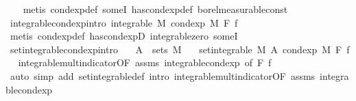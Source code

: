 \begin{isabellebody}
%
\isadelimproof
\ \ %
\endisadelimproof
%
\isatagproof
{}\isamarkupfalse%
\ {\isacharparenleft}{\kern0pt}metis\ cond{\isacharunderscore}{\kern0pt}exp{\isacharunderscore}{\kern0pt}def\ someI\ has{\isacharunderscore}{\kern0pt}cond{\isacharunderscore}{\kern0pt}exp{\isacharunderscore}{\kern0pt}def\ borel{\isacharunderscore}{\kern0pt}measurable{\isacharunderscore}{\kern0pt}const{\isacharparenright}{\kern0pt}%
\endisatagproof
{\isafoldproof}%
%
\isadelimproof
\isanewline
%
\endisadelimproof
\isanewline
{}\isamarkupfalse%
\ integrable{\isacharunderscore}{\kern0pt}cond{\isacharunderscore}{\kern0pt}exp{\isacharbrackleft}{\kern0pt}intro{\isacharbrackright}{\kern0pt}{\isacharcolon}{\kern0pt}\ {\isachardoublequoteopen}integrable\ M\ {\isacharparenleft}{\kern0pt}cond{\isacharunderscore}{\kern0pt}exp\ M\ F\ f{\isacharparenright}{\kern0pt}{\isachardoublequoteclose}\ \isanewline
%
\isadelimproof
\ \ %
\endisadelimproof
%
\isatagproof
{}\isamarkupfalse%
\ {\isacharparenleft}{\kern0pt}metis\ cond{\isacharunderscore}{\kern0pt}exp{\isacharunderscore}{\kern0pt}def\ has{\isacharunderscore}{\kern0pt}cond{\isacharunderscore}{\kern0pt}expD{\isacharparenleft}{\kern0pt}{}{\isacharparenright}{\kern0pt}\ integrable{\isacharunderscore}{\kern0pt}zero\ someI{\isacharparenright}{\kern0pt}%
\endisatagproof
{\isafoldproof}%
%
\isadelimproof
\isanewline
%
\endisadelimproof
\isanewline
{}\isamarkupfalse%
\ set{\isacharunderscore}{\kern0pt}integrable{\isacharunderscore}{\kern0pt}cond{\isacharunderscore}{\kern0pt}exp{\isacharbrackleft}{\kern0pt}intro{\isacharbrackright}{\kern0pt}{\isacharcolon}{\kern0pt}\isanewline
\ \ \ {\isachardoublequoteopen}A\ {\isasymin}\ sets\ M{\isachardoublequoteclose}\isanewline
\ \ \ {\isachardoublequoteopen}set{\isacharunderscore}{\kern0pt}integrable\ M\ A\ {\isacharparenleft}{\kern0pt}cond{\isacharunderscore}{\kern0pt}exp\ M\ F\ f{\isacharparenright}{\kern0pt}{\isachardoublequoteclose}%
\isadelimproof
\ %
\endisadelimproof
%
\isatagproof
{}\isamarkupfalse%
\ integrable{\isacharunderscore}{\kern0pt}mult{\isacharunderscore}{\kern0pt}indicator{\isacharbrackleft}{\kern0pt}OF\ assms\ integrable{\isacharunderscore}{\kern0pt}cond{\isacharunderscore}{\kern0pt}exp{\isacharcomma}{\kern0pt}\ of\ F\ f{\isacharbrackright}{\kern0pt}\ \isamarkupfalse%
\ {\isacharparenleft}{\kern0pt}auto\ simp\ add{\isacharcolon}{\kern0pt}\ set{\isacharunderscore}{\kern0pt}integrable{\isacharunderscore}{\kern0pt}def\ intro{\isacharbang}{\kern0pt}{\isacharcolon}{\kern0pt}\ integrable{\isacharunderscore}{\kern0pt}mult{\isacharunderscore}{\kern0pt}indicator{\isacharbrackleft}{\kern0pt}OF\ assms\ integrable{\isacharunderscore}{\kern0pt}cond{\isacharunderscore}{\kern0pt}exp{\isacharbrackright}{\kern0pt}{\isacharparenright}{\kern0pt}%

\end{isabellebody}

